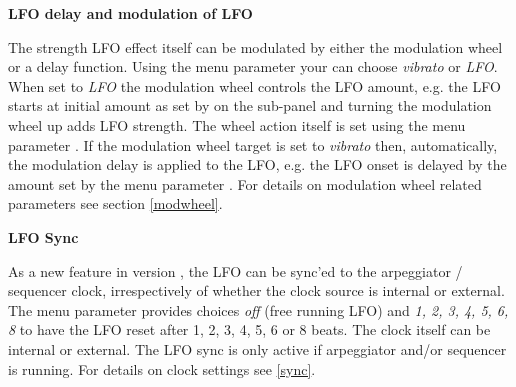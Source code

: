 \textbf{LFO delay and modulation of LFO}

The strength LFO effect itself can be modulated by either the modulation wheel or a delay function. Using the menu parameter \modwheeltarget your can choose \textit{vibrato} or \textit{LFO}. When set to \textit{LFO} the modulation wheel controls the LFO amount, e.g. the LFO starts at initial amount as set by \lfoamt on the sub-panel and turning the modulation wheel up adds LFO strength. The wheel action itself is set using the menu parameter \modwheelrange. If the modulation wheel target is set to \textit{vibrato} then, automatically, the modulation delay is applied to the LFO, e.g. the LFO onset is delayed by the amount set by the menu parameter \moddelay. For details on modulation wheel related parameters see section \ref{modwheel}.

\textbf{LFO Sync}

As a new feature in version \version, the LFO can be sync'ed to the arpeggiator / sequencer clock, irrespectively of whether the clock source is internal or external. The menu parameter \lfosync provides choices \textit{off} (free running LFO) and \textit{1, 2, 3, 4, 5, 6, 8} to have the LFO reset after 1, 2, 3, 4, 5, 6 or 8 beats. The clock itself can be internal or external. The LFO sync is only active if arpeggiator and/or sequencer is running. For details on clock settings see \ref{sync}.
